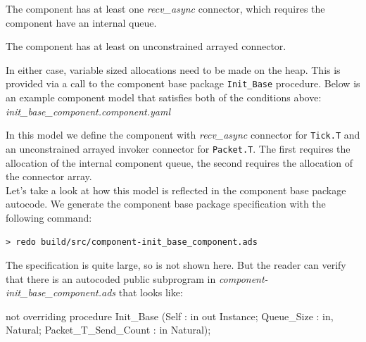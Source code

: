 \vspace{5mm} %
\begin{spaceditemize}
  \item The component has at least one \textit{recv\_async} connector, which requires the component have an internal queue.
  \item The component has at least on unconstrained arrayed connector.
\end{spaceditemize}
\vspace{5mm} %

In either case, variable sized allocations need to be made on the heap. This is provided via a call to the component base package \texttt{Init\_Base} procedure. Below is an example component model that satisfies both of the conditions above: \\

\textit{init\_base\_component.component.yaml}

In this model we define the component with \textit{recv\_async} connector for \texttt{Tick.T} and an unconstrained arrayed invoker connector for \texttt{Packet.T}. The first requires the allocation of the internal component queue, the second requires the allocation of the connector array. \\

Let's take a look at how this model is reflected in the component base package autocode. We generate the component base package specification with the following command:

\vspace{5mm} %
\begin{verbatim}
> redo build/src/component-init_base_component.ads
\end{verbatim}
\vspace{5mm} %

The specification is quite large, so is not shown here. But the reader can verify that there is an autocoded public subprogram in \textit{component-init\_base\_component.ads} that looks like:

\vspace{5mm} %
\begin{adacode}
  not overriding procedure Init_Base (Self : in out Instance; Queue_Size : in, Natural; Packet_T_Send_Count : in Natural);
\end{adacode}
\vspace{5mm} %

